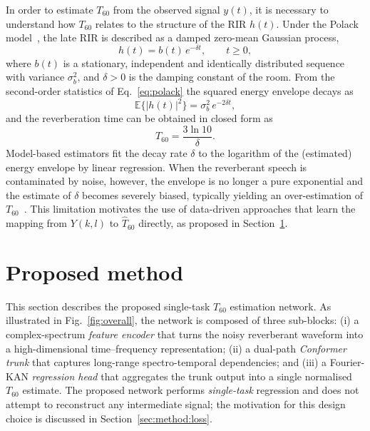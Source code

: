 \documentclass[a4paper,fleqn]{cas-sc}
\begin{document}
In order to estimate $T_{60}$ from the observed signal $y(t)$, it is
necessary to understand how $T_{60}$ relates to the structure of the
RIR $h(t)$. Under the Polack model~\citep{polack1988these}, the late
RIR is described as a damped zero-mean Gaussian process,
\begin{equation}\label{eq:polack}
  h(t) = b(t)\, e^{-\delta t},\qquad t\geq 0,
\end{equation}
where $b(t)$ is a stationary, independent and identically distributed
sequence with variance $\sigma_b^{2}$, and $\delta>0$ is the damping
constant of the room. From the second-order statistics of
Eq.~\eqref{eq:polack} the squared energy envelope decays as
\begin{equation}\label{eq:envelope}
  \mathbb{E}\{|h(t)|^{2}\} = \sigma_b^{2}\,e^{-2\delta t},
\end{equation}
and the reverberation time can be obtained in closed form as
\begin{equation}\label{eq:t60_from_delta}
  T_{60} = \frac{3\ln 10}{\delta}.
\end{equation}
Model-based estimators fit the decay rate $\delta$ to the logarithm of
the (estimated) energy envelope by linear regression. When the
reverberant speech is contaminated by noise, however, the envelope is
no longer a pure exponential and the estimate of $\delta$ becomes
severely biased, typically yielding an over-estimation of
$T_{60}$~\citep{gaubitch2012comparison}. This limitation motivates the
use of data-driven approaches that learn the mapping from $Y(k,l)$ to
$\hat{T}_{60}$ directly, as proposed in
Section~\ref{sec:method}.

\section{Proposed method}\label{sec:method}

This section describes the proposed single-task $T_{60}$ estimation
network. As illustrated in Fig.~\ref{fig:overall}, the
network is composed of three sub-blocks: (i) a complex-spectrum
\emph{feature encoder} that turns the noisy reverberant waveform into a
high-dimensional time--frequency representation; (ii) a dual-path
\emph{Conformer trunk} that captures long-range spectro-temporal
dependencies; and (iii) a Fourier-KAN \emph{regression head} that
aggregates the trunk output into a single normalised $T_{60}$ estimate.
The proposed network performs \emph{single-task} regression and does
not attempt to reconstruct any intermediate signal; the motivation for
this design choice is discussed in Section~\ref{sec:method:loss}.
\end{document}
